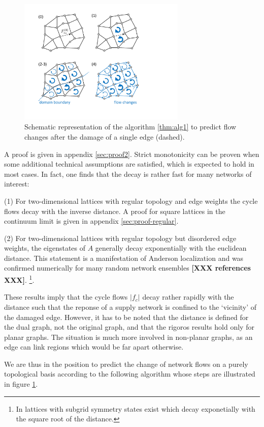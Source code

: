 \documentclass[10pt,aps,pra,twocolumn,superscriptaddress]{revtex4-1}
\begin{document}
\begin{figure}[tb]
\includegraphics[trim=2cm 2cm 7cm 3cm, width=8cm]{pics/scheme1.pdf}
\caption{
\label{fig:scheme}
Schematic representation of the algorithm \ref{thm:alg1} to predict
flow changes after the damage of a single edge (dashed).
}
\end{figure}

A proof is given in appendix \ref{sec:proof2}. Strict monotonicity can be proven when some additional technical assumptions are satisfied, which is expected to hold in most cases. In fact, one finds that the decay is rather fast for many networks of interest:

(1) For two-dimensional lattices with regular topology and edge weights the cycle flows decay with the inverse distance. A proof for square lattices in the continuum limit is given in appendix \ref{sec:proof-regular}.

(2) For two-dimensional lattices with regular topology but disordered edge weights, the eigenstates of $A$ generally decay exponentially with the euclidean distance. This statement is a manifestation of Anderson localization and was confirmed numerically for many random network ensembles \textbf{[XXX references XXX]}.
\footnote{In lattices with subgrid symmetry states exist which decay exponetially with the square root of the distance.}.  
  
These results imply that the cycle flows $|f_c|$ decay rather rapidly with the distance such that the reponse of a supply network is confined to the `vicinity' of the damaged edge. However, it has to be noted that the distance is defined  for the dual graph, not the original graph, and that the rigoros results hold only for planar graphs. The situation is much more involved in non-planar graphs, as an edge can link regions which would be far apart otherwise.

We are thus in the position to predict the change of network flows on a purely topological basis according to the following algorithm whose steps are illustrated in figure \ref{fig:scheme}.
\end{document}
